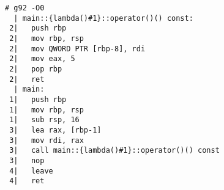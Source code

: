 \begin{lstlisting}[language={},numbers=none,title=\href{https://godbolt.org/z/1T8zYE}{\texttt{godbolt.org/z/1T8zYE}}]
# g92 -O0
  | main::{lambda()#1}::operator()() const:
 2|   push rbp
 2|   mov rbp, rsp
 2|   mov QWORD PTR [rbp-8], rdi
 2|   mov eax, 5
 2|   pop rbp
 2|   ret
  | main:
 1|   push rbp
 1|   mov rbp, rsp
 1|   sub rsp, 16
 3|   lea rax, [rbp-1]
 3|   mov rdi, rax
 3|   call main::{lambda()#1}::operator()() const
 3|   nop
 4|   leave
 4|   ret
\end{lstlisting}
